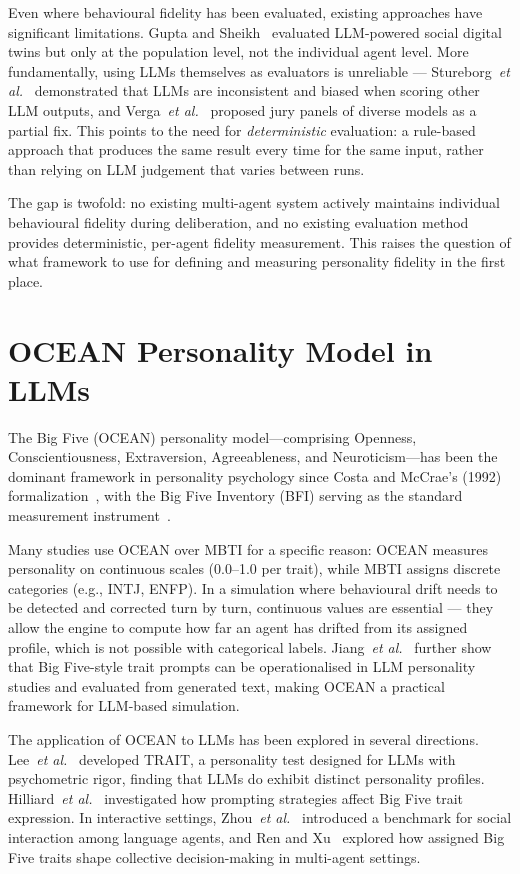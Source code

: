 \documentclass[12pt, a4paper]{report}
\newcommand{\etal}{\textit{et al.}}
\begin{document}
Even where behavioural fidelity has been evaluated, existing approaches have significant limitations. Gupta and Sheikh~\cite{gupta2026digital} evaluated LLM-powered social digital twins but only at the population level, not the individual agent level. More fundamentally, using LLMs themselves as evaluators is unreliable --- Stureborg~\etal~\cite{stureborg2024inconsistent} demonstrated that LLMs are inconsistent and biased when scoring other LLM outputs, and Verga~\etal~\cite{verga2024jury} proposed jury panels of diverse models as a partial fix. This points to the need for \textit{deterministic} evaluation: a rule-based approach that produces the same result every time for the same input, rather than relying on LLM judgement that varies between runs.

The gap is twofold: no existing multi-agent system actively maintains individual behavioural fidelity during deliberation, and no existing evaluation method provides deterministic, per-agent fidelity measurement. This raises the question of what framework to use for defining and measuring personality fidelity in the first place.


\section{OCEAN Personality Model in LLMs}

The Big Five (OCEAN) personality model---comprising Openness, Conscientiousness, Extraversion, Agreeableness, and Neuroticism---has been the dominant framework in personality psychology since Costa and McCrae's (1992) formalization~\cite{costa1992neo}, with the Big Five Inventory (BFI) serving as the standard measurement instrument~\cite{john1999bigfive}.

Many studies use OCEAN over MBTI for a specific reason: OCEAN measures personality on continuous scales (0.0--1.0 per trait), while MBTI assigns discrete categories (e.g., INTJ, ENFP). In a simulation where behavioural drift needs to be detected and corrected turn by turn, continuous values are essential --- they allow the engine to compute how far an agent has drifted from its assigned profile, which is not possible with categorical labels. Jiang~\etal~\cite{jiang2024personallm} further show that Big Five-style trait prompts can be operationalised in LLM personality studies and evaluated from generated text, making OCEAN a practical framework for LLM-based simulation.

The application of OCEAN to LLMs has been explored in several directions. Lee~\etal~\cite{lee2025trait} developed TRAIT, a personality test designed for LLMs with psychometric rigor, finding that LLMs do exhibit distinct personality profiles. Hilliard~\etal~\cite{hilliard2024eliciting} investigated how prompting strategies affect Big Five trait expression. In interactive settings, Zhou~\etal~\cite{zhou2024sotopia} introduced a benchmark for social interaction among language agents, and Ren and Xu~\cite{ren2025bigfive} explored how assigned Big Five traits shape collective decision-making in multi-agent settings.
\end{document}
